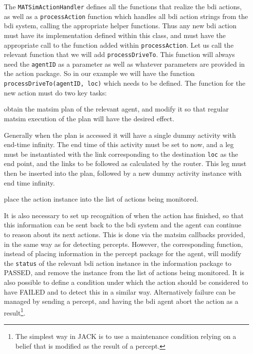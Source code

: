 The \lstinline{MATSimActionHandler} defines all the functions that
realize the \gls{bdi} actions, as well as a \lstinline{processAction} function
which handles all \gls{bdi} action strings from the \gls{bdi} system,
calling the appropriate helper functions. Thus any new \gls{bdi} action must have
its implementation defined within this class, and must have the appropriate
call to the function added within \lstinline{processAction}.  Let us call
the relevant function that we will add \lstinline{processDriveTo}. This function
will always need the \lstinline{agentID} as a parameter as well as
whatever parameters are provided in the action package. So in our
example we will have the function \lstinline{processDriveTo(agentID, loc)}
which needs to be defined. 
%
The function for the new action must do two key tasks:
\begin{tightenumerate}
\item obtain the \gls{matsim} plan of the relevant agent, and modify it so
  that regular \gls{matsim} execution of the plan will have the desired
  effect.

Generally when the plan is accessed it will have a single dummy
activity with end-time infinity. The end time of this activity must be
set to now, and a leg must be instantiated with the link corresponding
to the destination \lstinline{loc} as the end point, and the links to be
followed as calculated by the router. This leg must then be inserted
into the plan, followed by a new dummy activity instance with end time
infinity. 

\item place the action instance into the list of actions being
  monitored. 
\end{tightenumerate}

It is also necessary to set up recognition of when the action has
finished, so that this information can be sent back to the \gls{bdi} system
and the agent can continue to reason about its next actions.  This is
done via the \gls{matsim} callbacks provided, in the same way as for
detecting percepts. However, the corresponding function, instead of
placing information in the percept package for the agent, will modify
the \lstinline{status} of the relevant \gls{bdi} action instance in the
information package to PASSED, and remove the instance from the list
of actions being monitored. It is also possible to define a condition
under which the action should be considered to have FAILED
and to detect this in a similar way. Alternatively failure can be
managed by sending a percept, and having the \gls{bdi} agent abort the
action as a result\footnote{The simplest way in JACK is to use a
  maintenance condition relying on a belief that is modified as the
  result of a percept.}.

